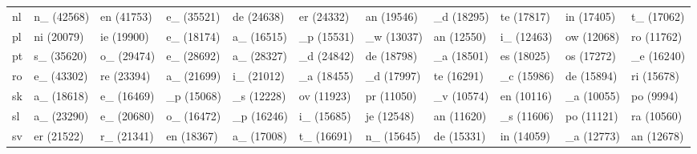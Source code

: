 \begin{tabular}{l|llllllllll}
nl	&n_ (42568)	&en (41753)	&e_ (35521)	&de (24638)	&er (24332)	&an (19546)	&_d (18295)	&te (17817)	&in (17405)	&t_ (17062)\\
pl	&ni (20079)	&ie (19900)	&e_ (18174)	&a_ (16515)	&_p (15531)	&_w (13037)	&an (12550)	&i_ (12463)	&ow (12068)	&ro (11762)\\
pt	&s_ (35620)	&o_ (29474)	&e_ (28692)	&a_ (28327)	&_d (24842)	&de (18798)	&_a (18501)	&es (18025)	&os (17272)	&_e (16240)\\
ro	&e_ (43302)	&re (23394)	&a_ (21699)	&i_ (21012)	&_a (18455)	&_d (17997)	&te (16291)	&_c (15986)	&de (15894)	&ri (15678)\\
sk	&a_ (18618)	&e_ (16469)	&_p (15068)	&_s (12228)	&ov (11923)	&pr (11050)	&_v (10574)	&en (10116)	&_a (10055)	&po (9994)\\
sl	&a_ (23290)	&e_ (20680)	&o_ (16472)	&_p (16246)	&i_ (15685)	&je (12548)	&an (11620)	&_s (11606)	&po (11121)	&ra (10560)\\
sv	&er (21522)	&r_ (21341)	&en (18367)	&a_ (17008)	&t_ (16691)	&n_ (15645)	&de (15331)	&in (14059)	&_a (12773)	&an (12678)\\
\end{tabular}
